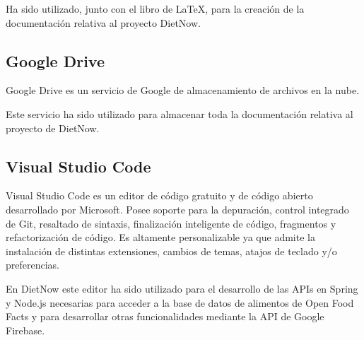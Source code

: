 Ha sido utilizado, junto con el libro \basix \hspace{0.5mm} \cite{basix} de \LaTeX, para la creación de la documentación relativa al proyecto DietNow.

\subsection{Google Drive}
Google Drive \cite{google_drive} es un servicio de Google de almacenamiento de archivos en la nube.

Este servicio ha sido utilizado para almacenar toda la documentación relativa al proyecto de DietNow.

\subsection{Visual Studio Code}
Visual Studio Code \cite{vscode} es un editor de código gratuito y de código abierto desarrollado por Microsoft. Posee soporte para la depuración, control integrado de Git, resaltado de sintaxis, finalización inteligente de código, fragmentos y refactorización de código. Es altamente personalizable ya que admite la instalación de distintas extensiones, cambios de temas, atajos de teclado y/o preferencias.

En DietNow este editor ha sido utilizado para el desarrollo de las APIs en Spring y Node.js necesarias para acceder a la base de datos de alimentos de Open Food Facts y para desarrollar otras funcionalidades mediante la API de Google Firebase.
